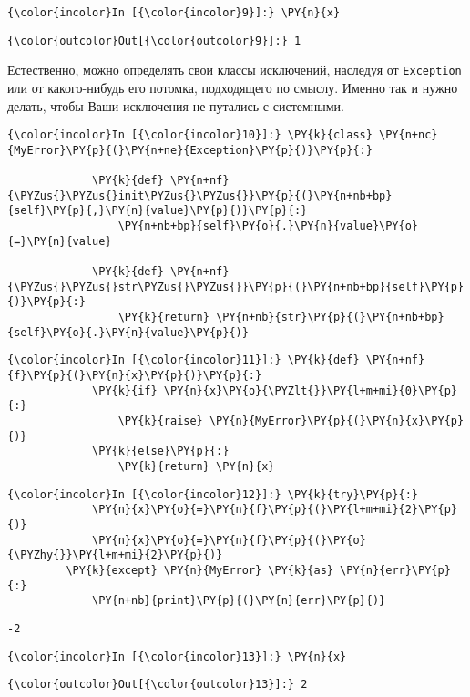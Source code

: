     \begin{Verbatim}[commandchars=\\\{\}]
{\color{incolor}In [{\color{incolor}9}]:} \PY{n}{x}
\end{Verbatim}

            \begin{Verbatim}[commandchars=\\\{\}]
{\color{outcolor}Out[{\color{outcolor}9}]:} 1
\end{Verbatim}
        
    Естественно, можно определять свои классы исключений, наследуя от
\texttt{Exception} или от какого-нибудь его потомка, подходящего по
смыслу. Именно так и нужно делать, чтобы Ваши исключения не путались с
системными.

    \begin{Verbatim}[commandchars=\\\{\}]
{\color{incolor}In [{\color{incolor}10}]:} \PY{k}{class} \PY{n+nc}{MyError}\PY{p}{(}\PY{n+ne}{Exception}\PY{p}{)}\PY{p}{:}
             
             \PY{k}{def} \PY{n+nf}{\PYZus{}\PYZus{}init\PYZus{}\PYZus{}}\PY{p}{(}\PY{n+nb+bp}{self}\PY{p}{,}\PY{n}{value}\PY{p}{)}\PY{p}{:}
                 \PY{n+nb+bp}{self}\PY{o}{.}\PY{n}{value}\PY{o}{=}\PY{n}{value}
                 
             \PY{k}{def} \PY{n+nf}{\PYZus{}\PYZus{}str\PYZus{}\PYZus{}}\PY{p}{(}\PY{n+nb+bp}{self}\PY{p}{)}\PY{p}{:}
                 \PY{k}{return} \PY{n+nb}{str}\PY{p}{(}\PY{n+nb+bp}{self}\PY{o}{.}\PY{n}{value}\PY{p}{)}
\end{Verbatim}

    \begin{Verbatim}[commandchars=\\\{\}]
{\color{incolor}In [{\color{incolor}11}]:} \PY{k}{def} \PY{n+nf}{f}\PY{p}{(}\PY{n}{x}\PY{p}{)}\PY{p}{:}
             \PY{k}{if} \PY{n}{x}\PY{o}{\PYZlt{}}\PY{l+m+mi}{0}\PY{p}{:}
                 \PY{k}{raise} \PY{n}{MyError}\PY{p}{(}\PY{n}{x}\PY{p}{)}
             \PY{k}{else}\PY{p}{:}
                 \PY{k}{return} \PY{n}{x}
\end{Verbatim}

    \begin{Verbatim}[commandchars=\\\{\}]
{\color{incolor}In [{\color{incolor}12}]:} \PY{k}{try}\PY{p}{:}
             \PY{n}{x}\PY{o}{=}\PY{n}{f}\PY{p}{(}\PY{l+m+mi}{2}\PY{p}{)}
             \PY{n}{x}\PY{o}{=}\PY{n}{f}\PY{p}{(}\PY{o}{\PYZhy{}}\PY{l+m+mi}{2}\PY{p}{)}
         \PY{k}{except} \PY{n}{MyError} \PY{k}{as} \PY{n}{err}\PY{p}{:}
             \PY{n+nb}{print}\PY{p}{(}\PY{n}{err}\PY{p}{)}
\end{Verbatim}

    \begin{Verbatim}[commandchars=\\\{\}]
-2

    \end{Verbatim}

    \begin{Verbatim}[commandchars=\\\{\}]
{\color{incolor}In [{\color{incolor}13}]:} \PY{n}{x}
\end{Verbatim}

            \begin{Verbatim}[commandchars=\\\{\}]
{\color{outcolor}Out[{\color{outcolor}13}]:} 2
\end{Verbatim}
